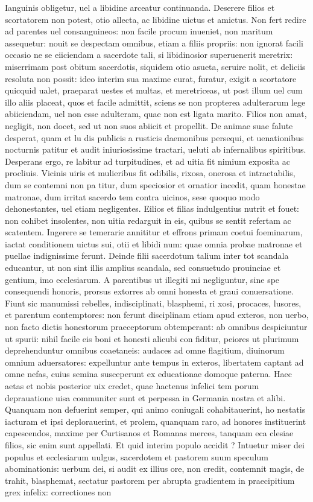 \documentclass{article}
\begin{document}
\begin{pages}
\marginpar{[ p.493 ]}\pstart Ianguinis obligetur, uel a libidine arceatur continuanda. Deserere filios et scortatorem non potest, otio allecta, ac libidine uictus et amictus. Non fert redire ad parentes uel consanguineos: non facile procum inueniet, non maritum assequetur: nouit se despectam omnibus, etiam a filiis propriis: non ignorat facili occasio ne se eiiciendam a sacerdote tali, si libidinosior superuenerit meretrix: miserrimam post obitum sacerdotis, siquidem otio asueta, seruire nolit, et deliciis resoluta non possit: ideo interim sua maxime curat, furatur, exigit a scortatore quicquid ualet, praeparat uestes et multas, et meretriceas, ut post illum uel cum illo aliis placeat, quos et facile admittit, sciens se non propterea adulterarum lege abiiciendam, uel non esse adulteram, quae non est ligata marito. Filios non amat, negligit, non docet, sed ut non suos abiicit et propellit. De animae suae falute desperat, quam et lu dis publicis a rusticis daemonibus persequi, et uenationibus nocturnis patitur et audit iniuriosissime tractari, ueluti ab infernalibus spiritibus. Desperans ergo, re labitur ad turpitudines, et ad uitia fit nimium exposita ac procliuis. Vicinis uiris et mulieribus fit odibilis, rixosa, onerosa et intractabilis, dum se contemni non pa titur, dum speciosior et ornatior incedit, quam honestae matronae, dum irritat sacerdo tem contra uicinos, sese quoquo modo dehonestantes, uel etiam negligentes. Eilios et filias indulgentius nutrit et fouet: non cohibet insolentes, non uitia redarguit in eis, quibus se sentit refertam ac scatentem. Ingerere se temerarie annititur et effrons primam coetui foeminarum, iactat conditionem uictus sui, otii et libidi num: quae omnia probae matronae et puellae indignissime ferunt. Deinde filii sacerdotum talium inter tot scandala educantur, ut non sint illis amplius scandala, sed consuetudo prouinciae et gentium, imo ecclesiarum. A parentibus ut illegiti mi negliguntur, sine spe consequendi honoris, prorsus extorres ab omni honesta et graui conuersatione. Fiunt sic manumissi rebelles, indisciplinati, blasphemi, ri xosi, procaces, lusores, et parentum contemptores: non ferunt disciplinam etiam apud exteros, non uerbo, non facto dictis honestorum praeceptorum obtemperant: ab omnibus despiciuntur ut spurii: nihil facile eis boni et honesti alicubi con fiditur, peiores ut plurimum deprehenduntur omnibus coaetaneis: audaces ad omne flagitium, diuinorum omnium aduersatores: expelluntur ante tempus in exteros, libertatem captant ad omne nefas, cuius semina susceperunt ex educationae domoque paterna. Haec aetas et nobis posterior uix credet, quae hactenus infelici tem porum deprauatione uisa communiter sunt et perpessa in Germania nostra et alibi. Quanquam non defuerint semper, qui animo coniugali cohabitauerint, ho nestatis iacturam et ipsi deplorauerint, et prolem, quanquam raro, ad honores instituerint capescendos, maxime per Curtisanos et Romanas merces, tanquam eca clesiae filios, sic enim sunt appellati. Et quid interim populo accidit ? Intuetur miser dei populus et ecclesiarum uulgus, sacerdotem et pastorem suum speculum abominationis: uerbum dei, si audit ex illius ore, non credit, contemnit magis, de trahit, blasphemat, sectatur pastorem per abrupta gradientem in praecipitium grex infelix: correctiones non 
\end{pages}
\end{document}
